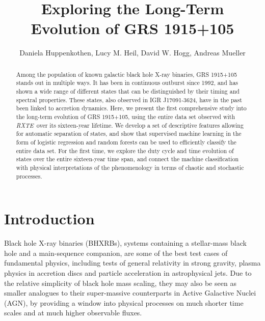 \documentclass[12pt]{emulateapj}
\newcommand{\project}[1]{\textsl{#1}}
\newcommand{\rxte}{\project{RXTE}}
\begin{document}
\title{Exploring the Long-Term Evolution of GRS 1915+105}

\author{Daniela Huppenkothen, Lucy M. Heil, David W. Hogg, Andreas Mueller}
 

  

\begin{abstract}
Among the population of known galactic black hole X-ray binaries, GRS 1915+105 stands out in multiple ways. It has been in continuous outburst since 1992, and has shown a wide range of different states that can be distinguished by their timing and spectral properties. These states, also observed in IGR J17091-3624, have in the past been linked to accretion dynamics. %
Here, we present the first comprehensive study into the long-term evolution of GRS 1915+105, using the entire data set observed with \rxte\ over its sixteen-year lifetime. We develop a set of descriptive features allowing for automatic separation of states, and show that supervised machine learning in the form of logistic regression and random forests can be used to efficiently classify the entire data set. For the first time, we explore the duty cycle and time evolution of states over the entire sixteen-year time span, and connect the machine classification with physical interpretations of the phenomenology in terms of chaotic and stochastic processes.
\end{abstract}


\section{Introduction}

Black hole X-ray binaries (BHXRBs), systems containing a stellar-mass black hole and a main-sequence companion, are some of the best test cases of fundamental physics, including tests of general relativity in strong gravity, plasma physics in accretion discs and particle acceleration in astrophysical jets. 
Due to the relative simplicity of black hole mass scaling, they may also be seen as smaller analogues to their super-massive counterparts in Active Galactive Nuclei (AGN), by providing a window into physical processes on much shorter time scales and at much higher observable fluxes.
\end{document}
